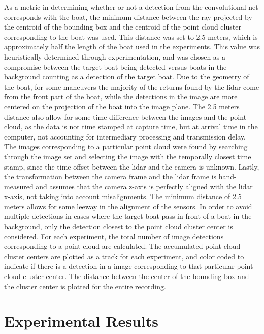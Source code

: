 As a metric in determining whether or not a detection from the convolutional net corresponds with the boat, the minimum distance between the ray projected by the centroid of the bounding box and the centroid of the point cloud cluster corresponding to the boat was used. This distance was set to 2.5 meters, which is approximately half the length of the boat used in the experiments. This value was heuristically determined through experimentation, and was chosen as a compromise between the target boat being detected versus boats in the background counting as a detection of the target boat. Due to the geometry of the boat, for some maneuvers the majority of the returns found by the lidar come from the front part of the boat, while the detections in the image are more centered on the projection of the boat into the image plane. The 2.5 meters distance also allow for some time difference between the images and the point cloud, as the data is not time stamped at capture time, but at arrival time in the computer, not accounting for intermediary processing and transmission delay. The images corresponding to a particular point cloud were found by searching through the image set and selecting the image with the temporally closest time stamp, since the time offset between the lidar and the camera is unknown. Lastly, the transformation between the camera frame and the lidar frame is hand-measured and assumes that the camera z-axis is perfectly aligned with the lidar x-axis, not taking into account misalignments. The minimum distance of 2.5 meters allows for some leeway in the alignment of the sensors. In order to avoid multiple detections in cases where the target boat pass in front of a boat in the background, only the detection closest to the point cloud cluster center is considered. For each experiment, the total number of image detections corresponding to a point cloud are calculated. The accumulated point cloud cluster centers are plotted as a track for each experiment, and color coded to indicate if there is a detection in a image corresponding to that particular point cloud cluster center. The distance between the center of the bounding box and the cluster center is plotted for the entire recording.
\section{Experimental Results}

